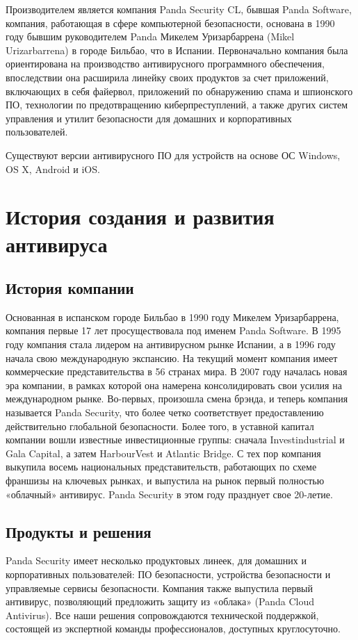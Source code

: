     Производителем является компания Panda Security CL, бывшая Panda Software, компания, работающая
    в сфере компьютерной безопасности, основана в 1990 году бывшим руководителем Panda Микелем 
    Уризарбаррена (Mikel Urizarbarrena) в городе Бильбао, что в Испании. Первоначально компания была
    ориентирована на производство антивирусного программного обеспечения, впоследствии она расширила
    линейку своих продуктов за счет приложений, включающих в себя файервол, приложений по обнаружению
    спама и шпионского ПО, технологии по предотвращению киберпреступлений, а также других систем
    управления и утилит безопасности для домашних и корпоративных пользователей\cite{intro}.\par

    Существуют версии антивирусного ПО для устройств на основе ОС Windows, OS X, Android и iOS.
    \pagebreak

    \section{История создания и развития антивируса}
    \subsection{История компании}
        Основанная в испанском городе Бильбао в 1990 году Микелем Уризарбаррена, компания первые 17 лет
        просуществовала под именем Panda Software. В 1995 году компания стала лидером на антивирусном рынке
        Испании, а в 1996 году начала свою международную экспансию. На текущий момент компания имеет коммерческие
        представительства в 56 странах мира. В 2007 году началась новая эра компании, в рамках которой она
        намерена консолидировать свои усилия на международном рынке. Во-первых, произошла смена брэнда, и
        теперь компания называется Panda Security, что более четко соответствует предоставлению действительно
        глобальной безопасности. Более того, в уставной капитал компании вошли известные инвестиционные группы:
        сначала Investindustrial и Gala Capital, а затем HarbourVest и Atlantic Bridge. С тех пор компания
        выкупила восемь национальных представительств, работающих по схеме франшизы на ключевых рынках, и
        выпустила на рынок первый полностью «облачный» антивирус. Panda Security в этом году празднует свое
        20-летие\cite{history}.
    \subsection{Продукты и решения}
        Panda Security имеет несколько продуктовых линеек, для домашних и корпоративных пользователей: ПО
        безопасности, устройства безопасности и управляемые сервисы безопасности. Компания также выпустила
        первый антивирус, позволяющий предложить защиту из «облака» (Panda Cloud Antivirus). Все наши решения
        сопровождаются технической поддержкой, состоящей из экспертной команды профессионалов, доступных
        круглосуточно.
